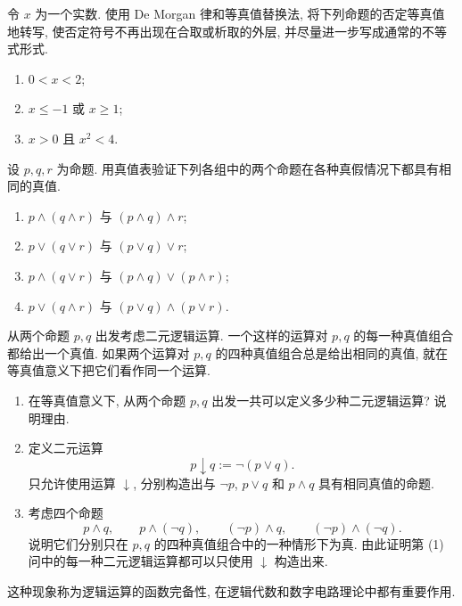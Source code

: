 \documentclass[usesamecnt, thmcnt=section, lang=cn, newtx, 10pt, scheme=chinese]{elegantbook}
\begin{document}
\begin{exercise}
\label{ex:logic-04}
令 $x$ 为一个实数. 使用 De Morgan 律和等真值替换法, 将下列命题的否定等真值地转写, 使否定符号不再出现在合取或析取的外层, 并尽量进一步写成通常的不等式形式.
\begin{enumerate}[label=\rm(\arabic*)]
  \item $0<x<2$;
  \item $x\leq -1$ 或 $x\geq 1$;
  \item $x>0$ 且 $x^2<4$.
\end{enumerate}
\end{exercise}

\begin{exercise}
\label{ex:logic-05}
设 $p,q,r$ 为命题. 用真值表验证下列各组中的两个命题在各种真假情况下都具有相同的真值.
\begin{enumerate}[label=\rm(\arabic*)]
  \item $p\wedge(q\wedge r)$ 与 $(p\wedge q)\wedge r$;
  \item $p\vee(q\vee r)$ 与 $(p\vee q)\vee r$;
  \item $p\wedge(q\vee r)$ 与 $(p\wedge q)\vee(p\wedge r)$;
  \item $p\vee(q\wedge r)$ 与 $(p\vee q)\wedge(p\vee r)$.
\end{enumerate}
\end{exercise}

\begin{challenge}
\label{ch:logic-02}
从两个命题 $p,q$ 出发考虑二元逻辑运算. 一个这样的运算对 $p,q$ 的每一种真值组合都给出一个真值. 如果两个运算对 $p,q$ 的四种真值组合总是给出相同的真值, 就在等真值意义下把它们看作同一个运算.
\begin{enumerate}[label=\rm(\arabic*)]
  \item 在等真值意义下, 从两个命题 $p,q$ 出发一共可以定义多少种二元逻辑运算? 说明理由.
  \item 定义二元运算
  \[
    p\downarrow q:=\neg(p\vee q).
  \]
  只允许使用运算 $\downarrow$, 分别构造出与 $\neg p$, $p\vee q$ 和 $p\wedge q$ 具有相同真值的命题.
  \item 考虑四个命题
  \[
  p\wedge q,\qquad
  p\wedge(\neg q),\qquad
  (\neg p)\wedge q,\qquad
  (\neg p)\wedge(\neg q).
  \]
  说明它们分别只在 $p,q$ 的四种真值组合中的一种情形下为真. 由此证明第 (1) 问中的每一种二元逻辑运算都可以只使用 $\downarrow$ 构造出来.
\end{enumerate}
这种现象称为逻辑运算的函数完备性, 在逻辑代数和数字电路理论中都有重要作用.
\end{challenge}
\end{document}
